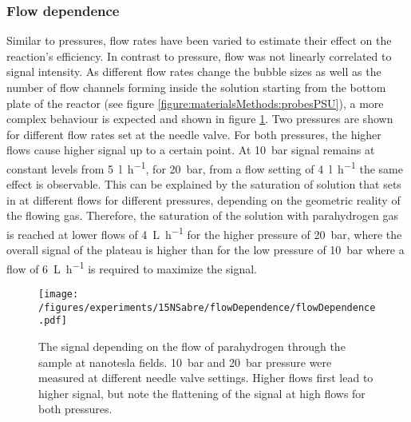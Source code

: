     \subsubsection{Flow dependence}
    Similar to pressures, flow rates have been varied to estimate their effect on the reaction's efficiency. In contrast to pressure, flow was not linearly correlated to signal intensity. As different flow rates change the bubble sizes as well as the number of flow channels forming inside the solution starting from the bottom plate of the reactor (see figure \ref{figure:materialsMethods:probesPSU}), a more complex behaviour is expected and shown in figure \ref{fig:results:15N:flowDependence}. Two pressures are shown for different flow rates set at the needle valve. For both pressures, the higher flows cause higher signal up to a certain point. At \SI{10}{\bar} signal remains at constant levels from \SI{5}{\litre\per\hour}, for \SI{20}{\bar}, from a flow setting of \SI{4}{\litre\per\hour} the same effect is observable. This can be explained by the saturation of solution that sets in at different flows for different pressures, depending on the geometric reality of the flowing gas. Therefore, the saturation of the solution with parahydrogen gas is reached at lower flows  of \SI{4}{\liter\per\hour} for the higher pressure of \SI{20}{\bar}, where the overall signal of the plateau is higher than for the low pressure of \SI{10}{\bar} where a flow of \SI{6}{\liter\per\hour} is required to maximize the signal.
        \begin{figure}
            \texttt{[image: /figures/experiments/15NSabre/flowDependence/flowDependence.pdf]}
            \caption[Flow dependence]{The signal depending on the flow of parahydrogen through the sample at nanotesla fields. \SI{10}{\bar} and \SI{20}{\bar} pressure were measured at different needle valve settings. Higher flows first lead to higher signal, but note the flattening of the signal at high flows for both pressures.}
            \label{fig:results:15N:flowDependence}
        \end{figure}

